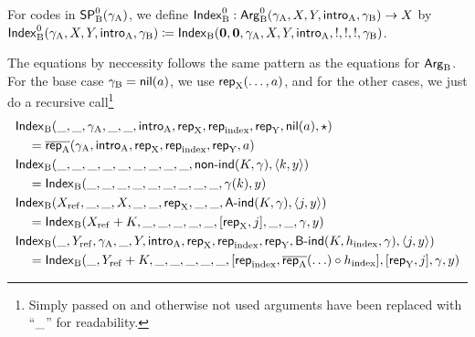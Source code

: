 \documentclass{article}
\begin{document}
For codes in $\SPBp(\gammaA)$, we define $\IndexBp : \ArgBp(\gammaA,
\A, \B, \introA, \gammaB) \to \A$ by $\IndexBp(\gammaA, \A, \B,
\introA, \gammaB) \coloneqq \IndexB(\zero, \zero, \gammaA, \A, \B,
\introA, \magicOmit{\A}, \magicOmit{\A}, \magicOmit{\B \circ
  \magicOmit{\A}}, \gammaB)$.

The equations by neccessity follows the same pattern as the equations
for $\ArgB$. For the base case $\gammaB = \nilB(a)$, we use
$\repA(\ldots, a)$, and for the other cases, we just do a recursive
call\footnote{Simply passed on and otherwise not used arguments have
  been replaced with ``$\omitt$'' for readability.}
%
%
\begin{align*} 
&  \IndexB(\omitt, \omitt, \gammaA, \omitt, \omitt, \introA, \repA, \repIndex, \repB, \nilB(a), \oneelt) \\
&\quad= \repAbar(\gammaA, \introA, \repA, \repIndex, \repB, a) \\
&  \IndexB(\omitt, \omitt, \omitt, \omitt, \omitt, \omitt, \omitt, \omitt, \omitt, \nonindB(K, \gamma), \pair{k}{y}) \\
&\quad= \IndexB(\omitt, \omitt, \omitt, \omitt, \omitt, \omitt, \omitt, \omitt, \omitt, \gamma(k), y) \\
&  \IndexB(\Xref, \omitt, \omitt, \A, \omitt, \omitt, \repA, \omitt, \omitt, \AindB(K, \gamma), \pair{j}{y}) \\
&\quad=  \IndexB(\Xref + K, \omitt, \omitt, \omitt, \omitt, \omitt,  [\repA, j], \omitt, \omitt, \gamma, y) \\
&  \IndexB(\omitt, \Yref, \gammaA, \omitt, \B, \introA, \repA, \repIndex, \repB, \BindB(K, \hindex, \gamma), \pair{j}{y}) \\
& \quad=   \IndexB(\omitt, \Yref + K, \omitt, \omitt, \omitt, \omitt, \omitt, [\repIndex, \repAbar(\ldots) \circ \hindex], [\repB, j], \gamma, y)
\end{align*}
\end{document}
